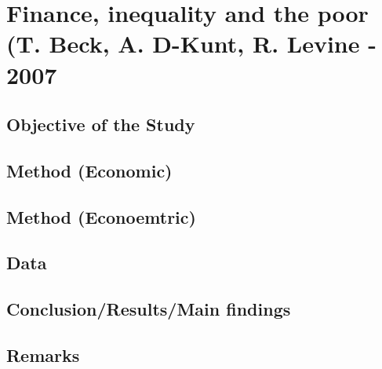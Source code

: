 \section{Finance, inequality and the poor (T. Beck, A. D-Kunt, R. Levine - 2007}
\subsection{Objective of the Study}
\subsection{Method (Economic)}
\subsection{Method (Econoemtric)}
\subsection{Data}
\subsection{Conclusion/Results/Main findings}
\subsection{Remarks}